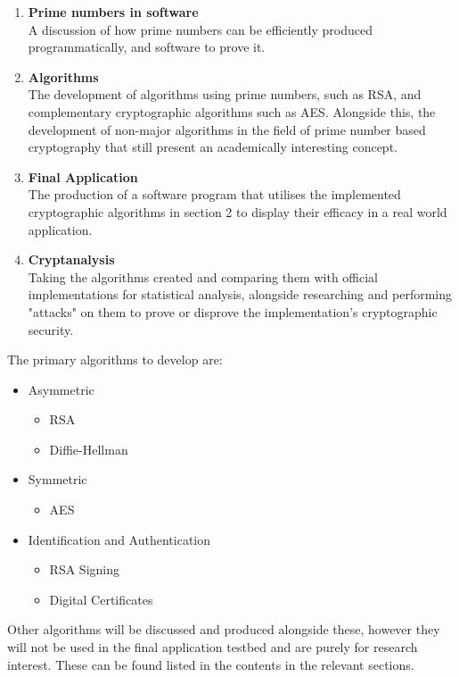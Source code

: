 \begin{enumerate}
	\item \textbf{Prime numbers in software} \\
		A discussion of how prime numbers can be efficiently produced programmatically, and software to prove it.
	\item \textbf{Algorithms} \\
		The development of algorithms using prime numbers, such as RSA, and complementary cryptographic algorithms such as AES. Alongside this, the development of non-major algorithms in the field of prime number based cryptography that still present an academically interesting concept.
	\item \textbf{Final Application} \\
		The production of a software program that utilises the implemented cryptographic algorithms in section 2 to display their efficacy in a real world application.
	\item \textbf{Cryptanalysis} \\
		Taking the algorithms created and comparing them with official implementations for statistical analysis, alongside researching and performing "attacks" on them to prove or disprove the implementation's cryptographic security.
\end{enumerate}

The primary algorithms to develop are:

\begin{itemize}
	\item Asymmetric
		\begin{itemize}
			\item RSA
			\item Diffie-Hellman
		\end{itemize}
	\item Symmetric
		\begin{itemize}
			\item AES
		\end{itemize}
	\item Identification and Authentication
		\begin{itemize}
			\item RSA Signing
			\item Digital Certificates
		\end{itemize}
\end{itemize}

Other algorithms will be discussed and produced alongside these, however they will not be used in the final application testbed and are purely for research interest. These can be found listed in the contents in the relevant sections.
		
